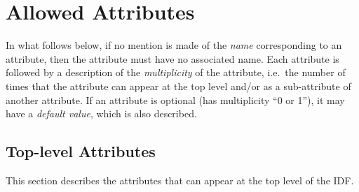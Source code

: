 \documentclass[11pt]{article}
\begin{document}
\section{Allowed Attributes}

In what follows below, if no mention is made of the {\it name}
corresponding to an attribute, then the attribute must have no associated
name.  Each attribute is followed by a description of the
{\it multiplicity} of the attribute, i.e.\ the number of times that the
attribute can appear at the top level and/or as a sub-attribute of another
attribute.  If an attribute is optional (has multiplicity ``0 or 1''),
it may have a {\it default value}, which is also described.

\subsection{Top-level Attributes}

This section describes the attributes that can appear at the top
level of the IDF.  

\end{document}
